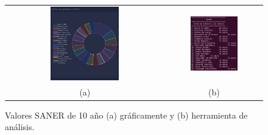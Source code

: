 \documentclass[a4paper, 12pt]{book}
\begin{document}
\begin{figure}[!h]
    \centering
    \begin{tabular}{cc}
    \includegraphics[width=0.45\textwidth]{img/saner_10_years_graph.png} &  
    \includegraphics[width=0.52\textwidth]{img/saner_10_years.png} \\ 
    (a) &(b) 
    \end{tabular}
    \caption{Valores SANER de 10 año (a) gráficamente y (b) herramienta de análisis.}
    \label{fig:comp_saner_10_year}
\end{figure}
\end{document}

